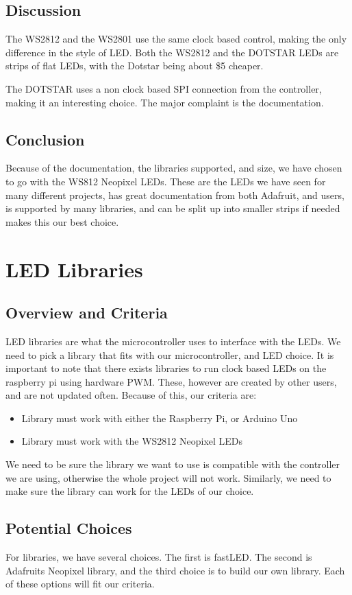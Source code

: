 \documentclass[onecolumn, draftclsnofoot,10pt, compsoc]{IEEEtran}
\begin{document}
		\subsection{Discussion}
		The WS2812 and the WS2801 use the same clock based control, making the only
		difference in the style of LED. Both the WS2812 and the DOTSTAR LEDs are
		strips of flat LEDs, with the Dotstar being about \$5 cheaper.

		\vspace{5mm}
		\noindent The DOTSTAR uses a non clock based SPI connection from the
		controller, making it an interesting choice. The major complaint is the
		documentation.
		\subsection{Conclusion}
		\noindent Because of the documentation, the libraries supported, and size,
		we have chosen to go with the WS812 Neopixel LEDs. These are the LEDs we
		have seen for many different projects, has great documentation from both
		Adafruit, and users, is supported by many libraries, and can be split up
		into smaller strips if needed makes this our best choice.


	\section{LED Libraries}
		\subsection{Overview and Criteria}
		\noindent LED libraries are what the microcontroller uses to interface with the LEDs.
		We need to pick a library that fits with our microcontroller, and LED
		choice. It is important to note that there exists libraries to run
		clock based LEDs on the raspberry pi using hardware PWM. These, however
		are created by other users, and are not updated often. Because of this, our
		criteria are:
		\begin{itemize}
			\item Library must work with either the Raspberry Pi, or Arduino Uno
			\item Library must work with the WS2812 Neopixel LEDs
		\end{itemize}
		\noindent We need to be sure the library we want to use is compatible with the
		controller we are using, otherwise the whole project will not work.
		Similarly, we need to make sure the library can work for the LEDs of our
		choice.
		\subsection{Potential Choices}
		\noindent For libraries, we have several choices. The first is fastLED. The second is
		Adafruits Neopixel library, and the third choice is to build our own
		library. Each of these options will fit our criteria.
\end{document}
